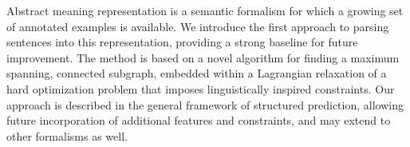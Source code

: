 Abstract meaning representation is a semantic formalism for which a growing set of annotated examples is available.  We introduce the first approach to parsing sentences into this representation, providing a strong baseline for future improvement.  The method is based on a novel algorithm for finding a maximum spanning, connected subgraph, embedded within a Lagrangian relaxation of a hard optimization problem that imposes linguistically inspired constraints. Our approach is described in the general framework of structured prediction, allowing future incorporation of additional features and constraints, and may extend to other formalisms as well.
